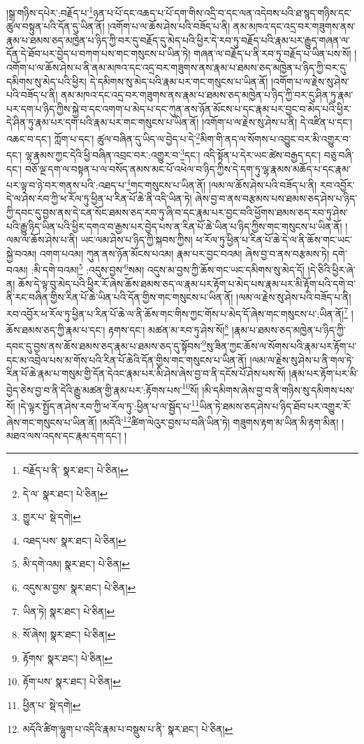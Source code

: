 །སྒྲ་གཉིས་དཔེར་:བརྗོད་པ་\footnote{བརྗོད་པ་ནི་  སྣར་ཐང་།  པེ་ཅིན། }ཉན་པ་པོ་དང་འཆད་པ་པོ་དག་གིས་འདྲི་བ་དང་ལན་འདེབས་པའི་ཐ་སྙད་གཉིས་དང་ཚུལ་བསྟུན་པའི་དོན་དུ་ཡིན་ནོ། །འགོག་པ་ལ་ཆོས་ཤེས་པའི་བཟོད་པ་ནི། ནམ་མཁའ་དང་འདྲ་བར་གཟུགས་ནས་རྣམ་པ་ཐམས་ཅད་མཁྱེན་པ་ཉིད་ཀྱི་བར་དུ་བརྗོད་དུ་མེད་པའི་ཕྱིར་དེ་རབ་ཏུ་བརྗོད་པའི་རྣམ་པར་རྒྱུད་གཞན་ལ་དོན་དེ་ཐོབ་པར་བྱེད་པ་བཀག་པས་གང་གསུངས་པ་ཡིན་ཏེ། གཞན་ལ་བརྗོད་པ་ནི་རབ་ཏུ་བརྗོད་པ་ཡིན་པས་སོ། །འགོག་པ་ལ་ཆོས་ཤེས་པ་ནི་ནམ་མཁའ་དང་འདྲ་བར་གཟུགས་ནས་རྣམ་པ་ཐམས་ཅད་མཁྱེན་པ་ཉིད་ཀྱི་བར་དུ་དམིགས་སུ་མེད་པའི་ཕྱིར། དེ་དམིགས་སུ་མེད་པའི་རྣམ་པར་གང་གསུངས་པ་ཡིན་ནོ། །འགོག་པ་ལ་རྗེས་སུ་ཤེས་པའི་བཟོད་པ་ནི། ནམ་མཁའ་དང་འདྲ་བར་གཟུགས་ནས་རྣམ་པ་ཐམས་ཅད་མཁྱེན་པ་ཉིད་ཀྱི་བར་དུ་ཤིན་ཏུ་རྣམ་པར་དག་པ་ཉིད་ཀྱིས་སྐྱེ་བ་དང་འགག་པ་མེད་པ་དང་ཀུན་ནས་ཉོན་མོངས་པ་དང་རྣམ་པར་བྱང་བ་མེད་པའི་ཕྱིར་དེ་ཤིན་ཏུ་རྣམ་པར་དག་པའི་རྣམ་པར་གང་གསུངས་པ་ཡིན་ནོ། །འགོག་པ་ལ་རྗེས་སུ་ཤེས་པ་ནི། དེ་འཛིན་པ་དང་། འཆང་བ་དང་། ཀློག་པ་དང་། ཚུལ་བཞིན་དུ་ཡིད་ལ་བྱེད་པ་དེ་\footnote{དེ་ལ་  སྣར་ཐང་།  པེ་ཅིན། }མིག་གི་ནད་ལ་སོགས་པ་འབྱུང་བར་མི་འགྱུར་བ་དང་། ལྷ་རྣམས་ཀྱང་དེའི་ཕྱི་བཞིན་འབྲང་བར་:འགྱུར་བ་\footnote{གྱུར་པ་  སྡེ་དགེ། }དང་། འདི་སྟོན་པ་དེར་ཡང་ཚེས་བརྒྱད་དང་། བཅུ་བཞི་དང་། བཅོ་ལྔ་དག་ལ་བསྟན་པ་ལ་བསོད་ནམས་མང་པོ་འཕེལ་བ་ཉིད་ཀྱིས་དེ་དག་ཏུ་ལྷ་རྣམས་མཆོད་པ་དང་རྣམ་པར་ལྟ་བ་ཉེ་བར་གནས་པའི་:འཐད་པ་\footnote{འཐད་པས་  སྣར་ཐང་།  པེ་ཅིན། }གང་གསུངས་པ་ཡིན་ནོ། །ལམ་ལ་ཆོས་ཤེས་པའི་བཟོད་པ་ནི། རབ་འབྱོར་དེ་ལ་ཤེས་རབ་ཀྱི་ཕ་རོལ་ཏུ་ཕྱིན་པ་རིན་པོ་ཆེ་ནི་འདི་ཡིན་ཏེ། ཞེས་བྱ་བ་ནས་བརྩམས་པས་ཐམས་ཅད་ཤེས་པ་ཉིད་ཀྱི་དབང་དུ་བྱས་ནས་དེ་ངན་སོང་ཐམས་ཅད་རབ་ཏུ་ཞི་བ་དང་རྣམ་པར་བྱང་བའི་ཕྱོགས་ཐམས་ཅད་རབ་ཏུ་ཤེས་པའི་རྒྱུ་ཉིད་ཡིན་པའི་ཕྱིར་དགའ་བ་རྒྱས་པར་བྱེད་པས་ན་རིན་པོ་ཆེ་ཡིན་པ་ཉིད་ཀྱིས་གང་གསུངས་པ་ཡིན་ནོ། །ལམ་ལ་ཆོས་ཤེས་པ་ནི། ཡང་ལམ་ཤེས་པ་ཉིད་ཀྱི་སྐབས་ཀྱིས། ཕ་རོལ་ཏུ་ཕྱིན་པ་རིན་པོ་ཆེ་དེ་ལ་ནི་ཆོས་གང་ཡང་སྐྱེ་བའམ། འགག་པའམ། ཀུན་ནས་ཉོན་མོངས་པའམ། རྣམ་པར་བྱང་བའམ། ཞེས་བྱ་བ་ནས་བརྩམས་ཏེ། དགེ་བའམ། :མི་དགེ་བའམ།\footnote{མི་དགེ་འམ།  སྣར་ཐང་།  པེ་ཅིན། } :འདུས་བྱས་\footnote{འདུས་མ་བྱས་  སྣར་ཐང་།  པེ་ཅིན། }སམ། འདུས་མ་བྱས་ཀྱི་ཆོས་གང་ཡང་དམིགས་སུ་མེད་དོ། །དེ་ཅིའི་ཕྱིར་ཞེ་ན། ཆོས་དེ་ལྟ་བུ་མེད་པའི་ཕྱིར་རོ་ཞེས་ཆོས་ཐམས་ཅད་ལ་རྣམ་པར་རྟོག་པ་མེད་པས་རྣམ་པར་མི་རྟོག་པའི་དགེ་བ་ནི་རང་བཞིན་གྱིས་རིན་པོ་ཆེ་ཡིན་པའི་དོན་གྱིས་གང་གསུངས་པ་ཡིན་ནོ། །ལམ་ལ་རྗེས་སུ་ཤེས་པའི་བཟོད་པ་ནི། རབ་འབྱོར་ཕ་རོལ་ཏུ་ཕྱིན་པ་རིན་པོ་ཆེ་ལ་ནི་ཆོས་གང་གིས་ཀྱང་གོས་པ་མེད་དོ་ཞེས་གང་གསུངས་པ་:ཡིན་ནོ།\footnote{ཡིན་ཏེ།  སྣར་ཐང་།  པེ་ཅིན། } །ཆོས་ཐམས་ཅད་ཀྱི་རྣམ་པ་དང་། རྟགས་དང་། མཚན་མ་རབ་ཏུ་ཤེས་སོ།\footnote{སོ་ཞེས།  སྣར་ཐང་།  པེ་ཅིན། } །རྣམ་པ་ཐམས་ཅད་མཁྱེན་པ་ཉིད་ཀྱི་དབང་དུ་བྱས་ནས་ཆོས་ཐམས་ཅད་རྣམ་པ་ཐམས་ཅད་དུ་སྟོབས་\footnote{རྟོགས་  སྣར་ཐང་།  པེ་ཅིན། }སུ་ཟིན་ཀྱང་ཆོས་ལ་སོགས་པའི་རྣམ་པར་རྟོག་པ་དང་མ་འབྲེལ་པས་མ་གོས་པའི་རིན་པོ་ཆེའི་དོན་གྱིས་གང་གསུངས་པ་ཡིན་ནོ། །ལམ་ལ་རྗེས་སུ་ཤེས་པ་ནི་གལ་ཏེ་རིན་པོ་ཆེ་རྣམ་པ་གསུམ་གྱི་དོན་དེའང་རྣམ་པར་མི་ཤེས་ཞེས་བྱ་བ་ནི་དངོས་པོ་ཤེས་པས་སོ། །རྣམ་པར་རྟོག་པར་མི་བྱེད་ཅེས་བྱ་བ་ནི་དེའི་རྒྱུ་མཚན་གྱི་རྣམ་པར་:རྟོགས་པས་\footnote{རྟོག་པས་  སྣར་ཐང་།  པེ་ཅིན། }སོ། །མི་དམིགས་ཞེས་བྱ་བ་ནི་གཉིས་སུ་དམིགས་པས་སོ། །དེ་ལྟར་སྤྱོད་ན་ཤེས་རབ་ཀྱི་ཕ་རོལ་ཏུ་:ཕྱིན་པ་ལ་སྦྱོད་པ་\footnote{ཕྱིན་པ་  སྡེ་དགེ། }ཡིན་ཏེ་ཐམས་ཅད་ཤེས་པ་ཉིད་ཐོབ་པར་འགྱུར་རོ་ཞེས་གང་གསུངས་པ་ཡིན་ནོ། །མདོའི་\footnote{མདོའི་ཚིག་ལྷུག་པ་འདིའི་རྣམ་པ་བསྡུས་པ་ནི་  སྣར་ཐང་།  པེ་ཅིན། }ཚིག་ལེའུར་བྱས་པ་བཞི་ཡིན་ཏེ། གཟུགས་རྟག་མ་ཡིན་མི་རྟག་མིན། །མཐའ་ལས་འདས་དང་རྣམ་དག་དང་། །
